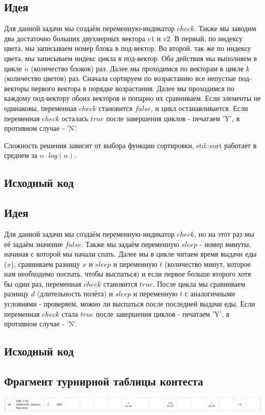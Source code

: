 \subsection*{Идея}
Для данной задачи мы создаём переменную-индикатор $check$. Также мы заводим два достаточно больших двухмерных вектора $v1$ и $v2$. В первый, по индексу цвета, мы записываем номер блока в под-вектор. Во второй, так же по индексу цвета, мы записываем индекс цикла в под-вектор. Оба действия мы выполняем в цикле $n$ (количество блоков) раз. Далее мы проходимся по векторам в цикле $k$ (количество цветов) раз. Сначала сортируем по возрастанию все непустые под-векторы первого вектора в порядке возрастания. Далее мы проходимся по каждому под-вектору обоих векторов и попарно их сравниваем. Если элементы не одинаковы, переменная $check$ становится $false$, и цикл останавливается. Если переменная $check$ осталась $true$ после завершения циклов -  печатаем 'Y', в противном случае - 'N'.

Сложность решения зависит от выбора функции сортировки, std::sort работает в среднем за $n \cdot log(n)$.
\subsection*{Исходный код}


\subsection*{Идея}
Для данной задачи мы создаём переменную-индикатор $check$, но на этот раз мы её задаём значение $false$. Также мы задаём переменную $sleep$ - номер минуты, начиная с которой мы начали спать. Далее мы в цикле читаем время выдачи еды ($x$), сравниваем разницу $x$ и $sleep$ и переменную $t$ (количество минут, которое нам необходимо поспать, чтобы выспаться) и если первое больше второго хотя бы один раз, переменная $check$ становится $true$. После цикла мы сравниваем разницу $d$ (длительность полёта) и $sleep$ и переменную $t$ с аналогичными условиями - проверяем, можно ли выспаться после последней выдачи еды. Если переменная $check$ стала $true$ после завершения циклов -  печатаем 'Y', в противном случае - 'N'.
\subsection*{Исходный код}

\subsection*{Фрагмент турнирной таблицы контеста}
\includegraphics[scale=0.5]{standings/1004.png}\newline\noindent
\pagebreak

